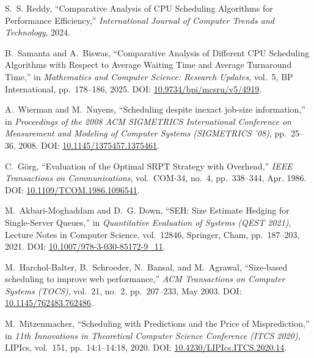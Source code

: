 \documentclass[11pt]{article}
\begin{document}
\begin{enumerate}[leftmargin=2.0em, label={[\arabic*]}]

    \item S.~S. Reddy, ``Comparative Analysis of CPU Scheduling Algorithms for Performance Efficiency,'' \textit{International Journal of Computer Trends and Technology}, 2024.

    \item B.~Samanta and A.~Biswas, ``Comparative Analysis of Different CPU Scheduling Algorithms with Respect to Average Waiting Time and Average Turnaround Time,'' in \textit{Mathematics and Computer Science: Research Updates}, vol.~5, BP International, pp.~178--186, 2025. DOI: \url{10.9734/bpi/mcsru/v5/4919}.

    \item A.~Wierman and M.~Nuyens, ``Scheduling despite inexact job-size information,'' in \textit{Proceedings of the 2008 ACM SIGMETRICS International Conference on Measurement and Modeling of Computer Systems (SIGMETRICS '08)}, pp.~25--36, 2008. DOI: \url{10.1145/1375457.1375461}.

    \item C.~G{\"o}rg, ``Evaluation of the Optimal SRPT Strategy with Overhead,'' \textit{IEEE Transactions on Communications}, vol.~COM-34, no.~4, pp.~338--344, Apr. 1986. DOI: \url{10.1109/TCOM.1986.1096541}.

    \item M.~Akbari-Moghaddam and D.~G. Down, ``SEH: Size Estimate Hedging for Single-Server Queues,'' in \textit{Quantitative Evaluation of Systems (QEST 2021)}, Lecture Notes in Computer Science, vol.~12846, Springer, Cham, pp.~187--203, 2021. DOI: \url{10.1007/978-3-030-85172-9_11}.

    \item M.~Harchol-Balter, B.~Schroeder, N.~Bansal, and M.~Agrawal, ``Size-based scheduling to improve web performance,'' \textit{ACM Transactions on Computer Systems (TOCS)}, vol.~21, no.~2, pp.~207--233, May 2003. DOI: \url{10.1145/762483.762486}.

    \item M.~Mitzenmacher, ``Scheduling with Predictions and the Price of Misprediction,'' in \textit{11th Innovations in Theoretical Computer Science Conference (ITCS 2020)}, LIPIcs, vol.~151, pp.~14:1--14:18, 2020. DOI: \url{10.4230/LIPIcs.ITCS.2020.14}.

\end{enumerate}
\end{document}
